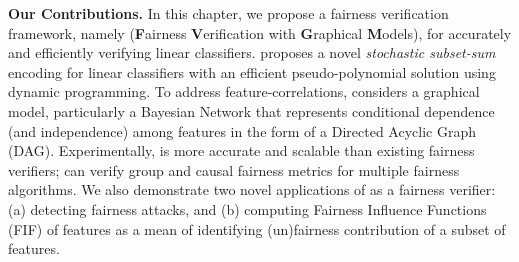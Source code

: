 	
	

	

	
	
%	
%	
	

	
	
	\textbf{Our Contributions.} In this chapter, we propose a fairness verification framework, namely {\fvgm} (\textbf{F}airness \textbf{V}erification with \textbf{G}raphical \textbf{M}odels), for accurately and efficiently verifying linear classifiers. {\fvgm} proposes a novel \textit{stochastic subset-sum} encoding for linear classifiers with an efficient pseudo-polynomial solution using dynamic programming. To address feature-correlations, {\fvgm} considers a graphical model, particularly a Bayesian Network that represents conditional dependence (and independence) among features in the form of a Directed Acyclic Graph (DAG).  
	Experimentally,  {\fvgm} is more accurate and scalable than existing fairness verifiers; {\fvgm} can verify group and causal fairness metrics for multiple fairness algorithms. We also demonstrate two novel applications of {\fvgm} as a fairness verifier: (a) detecting fairness attacks, and (b) computing Fairness Influence Functions (FIF) of features as a mean of identifying (un)fairness contribution of a subset of features. 
	


